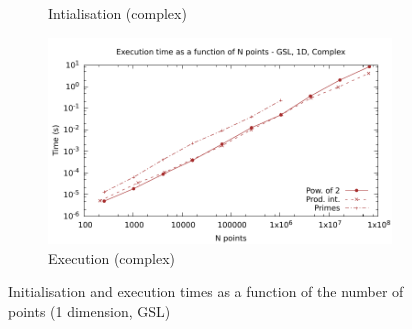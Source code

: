 \documentclass[12pt, a4paper]{article}
\begin{document}
\begin{figure}[H]
\begin{subfigure}{.5\textwidth}
\caption{Intialisation (complex)}
\label{1DGSLCI}
\end{subfigure}%
\begin{subfigure}{.5\textwidth}
\centering
\includegraphics[width=.9\linewidth]{graphs/1d-gsl-exec-c.pdf}
\caption{Execution (complex)}
\label{1DGSLC}
\end{subfigure}
\caption{Initialisation and execution times as a function of the number of points (1 dimension, GSL)}
\label{1DGSL}
\end{figure}
\end{document}
